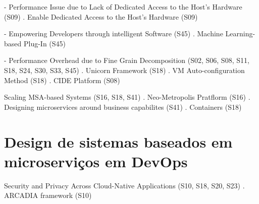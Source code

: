     - Performance Issue due to Lack of Dedicated Access to the Host's Hardware (S09)
        . Enable Dedicated Access to the Host's Hardware (S09)

    - Empowering Developers through intelligent Software (S45)
        . Machine Learning-based Plug-In (S45)

    - Performance Overhead due to Fine Grain Decomposition (S02, S06, S08, S11, S18, S24, S30, S33, S45)
        . Unicorn Framework (S18)
        . VM Auto-configuration Method (S18)
        . CIDE Platform (S08)

    Scaling MSA-based Systems (S16, S18, S41)
        . Neo-Metropolis Pratflorm (S16)
        . Designing microservices around business capabilites (S41)
        . Containers (S18)

\section{Design de sistemas baseados em microserviços em DevOps}

Security and Privacy Across Cloud-Native Applications (S10, S18, S20, S23)
    . ARCADIA framework (S10)